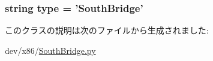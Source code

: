 \label{classSouthBridge_1_1SouthBridge_a05a57a2974f0aeff7ea53b64039e080a}
\hypertarget{classSouthBridge_1_1SouthBridge_acce15679d830831b0bbe8ebc2a60b2ca}{
\subsubsection[{type}]{\setlength{\rightskip}{0pt plus 5cm}string {\bf type} = '{\bf SouthBridge}'}}
\label{classSouthBridge_1_1SouthBridge_acce15679d830831b0bbe8ebc2a60b2ca}


このクラスの説明は次のファイルから生成されました:\begin{DoxyCompactItemize}
\item 
dev/x86/\hyperlink{SouthBridge_8py}{SouthBridge.py}\end{DoxyCompactItemize}
